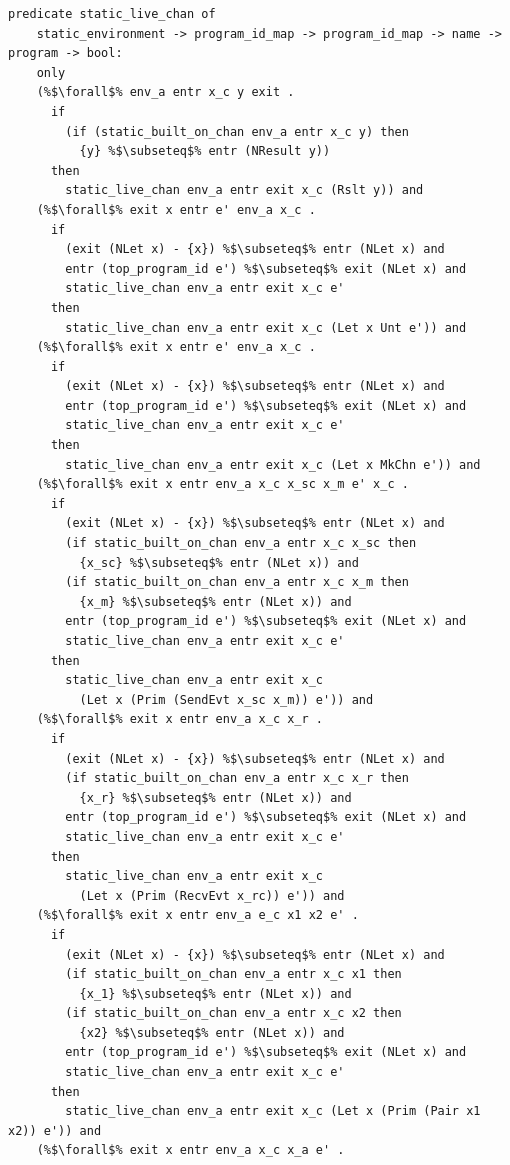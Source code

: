 \documentclass{article}
\begin{document}
\begin{lstlisting}[language=logic, escapechar=\%]
  predicate static_live_chan of
    static_environment -> program_id_map -> program_id_map -> name -> program -> bool:
    only
    (%$\forall$% env_a entr x_c y exit .
      if
        (if (static_built_on_chan env_a entr x_c y) then
          {y} %$\subseteq$% entr (NResult y))
      then
        static_live_chan env_a entr exit x_c (Rslt y)) and
    (%$\forall$% exit x entr e' env_a x_c .
      if 
        (exit (NLet x) - {x}) %$\subseteq$% entr (NLet x) and
        entr (top_program_id e') %$\subseteq$% exit (NLet x) and
        static_live_chan env_a entr exit x_c e'
      then 
        static_live_chan env_a entr exit x_c (Let x Unt e')) and
    (%$\forall$% exit x entr e' env_a x_c .
      if
        (exit (NLet x) - {x}) %$\subseteq$% entr (NLet x) and
        entr (top_program_id e') %$\subseteq$% exit (NLet x) and
        static_live_chan env_a entr exit x_c e'
      then 
        static_live_chan env_a entr exit x_c (Let x MkChn e')) and
    (%$\forall$% exit x entr env_a x_c x_sc x_m e' x_c .
      if
        (exit (NLet x) - {x}) %$\subseteq$% entr (NLet x) and
        (if static_built_on_chan env_a entr x_c x_sc then
          {x_sc} %$\subseteq$% entr (NLet x)) and
        (if static_built_on_chan env_a entr x_c x_m then 
          {x_m} %$\subseteq$% entr (NLet x)) and
        entr (top_program_id e') %$\subseteq$% exit (NLet x) and
        static_live_chan env_a entr exit x_c e'
      then
        static_live_chan env_a entr exit x_c
          (Let x (Prim (SendEvt x_sc x_m)) e')) and
    (%$\forall$% exit x entr env_a x_c x_r .    
      if
        (exit (NLet x) - {x}) %$\subseteq$% entr (NLet x) and
        (if static_built_on_chan env_a entr x_c x_r then
          {x_r} %$\subseteq$% entr (NLet x)) and
        entr (top_program_id e') %$\subseteq$% exit (NLet x) and
        static_live_chan env_a entr exit x_c e'
      then
        static_live_chan env_a entr exit x_c
          (Let x (Prim (RecvEvt x_rc)) e')) and
    (%$\forall$% exit x entr env_a e_c x1 x2 e' .
      if
        (exit (NLet x) - {x}) %$\subseteq$% entr (NLet x) and
        (if static_built_on_chan env_a entr x_c x1 then
          {x_1} %$\subseteq$% entr (NLet x)) and
        (if static_built_on_chan env_a entr x_c x2 then
          {x2} %$\subseteq$% entr (NLet x)) and
        entr (top_program_id e') %$\subseteq$% exit (NLet x) and
        static_live_chan env_a entr exit x_c e'
      then
        static_live_chan env_a entr exit x_c (Let x (Prim (Pair x1 x2)) e')) and
    (%$\forall$% exit x entr env_a x_c x_a e' . 

\end{lstlisting}
\end{document}
